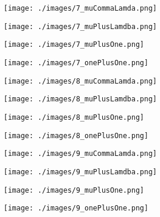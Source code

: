\documentclass[landscape,11pt]{article}
\begin{document}
\begin{figure}
    \centering
    \texttt{[image: ./images/7\_muCommaLamda.png]}
\end{figure}\begin{figure}
    \centering
    \texttt{[image: ./images/7\_muPlusLamdba.png]}
\end{figure}\begin{figure}
    \centering
    \texttt{[image: ./images/7\_muPlusOne.png]}
\end{figure}\begin{figure}
    \centering
    \texttt{[image: ./images/7\_onePlusOne.png]}
\end{figure}\begin{figure}
    \centering
    \texttt{[image: ./images/8\_muCommaLamda.png]}
\end{figure}\begin{figure}
    \centering
    \texttt{[image: ./images/8\_muPlusLamdba.png]}
\end{figure}\begin{figure}
    \centering
    \texttt{[image: ./images/8\_muPlusOne.png]}
\end{figure}\begin{figure}
    \centering
    \texttt{[image: ./images/8\_onePlusOne.png]}
\end{figure}\begin{figure}
    \centering
    \texttt{[image: ./images/9\_muCommaLamda.png]}
\end{figure}\begin{figure}
    \centering
    \texttt{[image: ./images/9\_muPlusLamdba.png]}
\end{figure}\begin{figure}
    \centering
    \texttt{[image: ./images/9\_muPlusOne.png]}
\end{figure}\begin{figure}
    \centering
    \texttt{[image: ./images/9\_onePlusOne.png]}
\end{figure}
\end{document}
